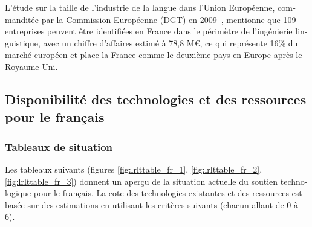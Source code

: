 \begin{french}
\begin{multicols}{2}
L'étude sur la taille de l'industrie de la langue dans l'Union
Européenne, commanditée par la Commission Européenne (DGT) en
2009~\cite{dgt08}, mentionne que 109 entreprises peuvent être
identifiées en France dans le périmètre de l'ingénierie linguistique,
avec un chiffre d'affaires estimé à 78,8 M€, ce qui représente 16\% du
marché européen et place la France comme le deuxième pays en
Europe après le Royaume-Uni.

\subsection{Disponibilité des technologies et des ressources pour le français}



\subsubsection{Tableaux de situation}
Les tableaux suivants (figures \ref{fig:lrlttable_fr_1},
\ref{fig:lrlttable_fr_2}, \ref{fig:lrlttable_fr_3}) donnent un aperçu
de la situation actuelle du soutien technologique pour le français. La
cote des technologies existantes et des ressources est basée sur des
estimations en utilisant les critères suivants (chacun allant de 0 à
6).


\end{multicols}
\end{french}
